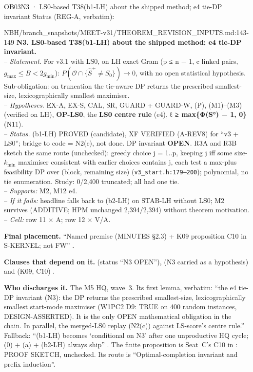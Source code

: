 \begin{card}{OB03}{N3 · LS0-based T38(b1-LH) about the shipped method; e4 tie-DP invariant}
Status (REG-A, verbatim):  
\begin{stmt}{NBH/branch_snapshots/MEET-v31/THEOREM_REVISION_INPUTS.md:143-149}
\textbf{N3. LS0-based T38(b1-LH) about the shipped method; e4 tie-DP invariant.}\\
– \emph{Statement.} For v3.1 with LS0, on LH exact Gram (p ≤ n − 1, c linked pairs, $g_{\max} ≤ B < 2g_{\min}$): $P(𝒪 ∩ \{\hat{S}^{+} ≠ S_0\}) → 0$, with no open statistical hypothesis. Sub-obligation: on truncation the tie-aware DP returns the prescribed smallest-size, lexicographically smallest maximiser.\\
– \emph{Hypotheses.} EX-A, EX-S, CAL, SR, GUARD + GUARD-W, (P), (M1)–(M3) (verified on LH), \textbf{OP-LS0}, the \textbf{LS0 centre rule} (e4), \textbf{ℓ ≥ max\{Φ(S°) − 1, 0\}} (N11).\\
– \emph{Status.} (b1-LH) PROVED (candidate), XF VERIFIED (A-REV8) for ``v3 + LS0''; bridge to code = N2(c), not done. DP invariant \textbf{OPEN}. R3A and R3B sketch the same route (unchecked): greedy choice j = 1..p, keeping j iff some size-$k_{\min}$ maximiser consistent with earlier choices contains j, each test a max-plus feasibility DP over (block, remaining size) (\texttt{v3\_start.h:179–200}); polynomial, no tie enumeration. Study: 0/2,400 truncated; all had one tie.\\
– \emph{Supports:} M2, M12 e4.\\
– \emph{If it fails:} headline falls back to (b2-LH) on STAB-LH without LS0; M2 survives (ADDITIVE; HPM unchanged 2,394/2,394) without theorem motivation.\\
– \emph{Cell:} row 11 × A; row 12 × V/A.
\end{stmt}
\textbf{Final placement.} ``Named premise (MINUTES §2.3) + K09 proposition C10 in S-KERNEL; not FW'' .

\textbf{Clauses that depend on it.}  (status ``N3 OPEN''),  (N3 carried as a hypothesis) and  (K09, C10) .

\textbf{Who discharges it.} The M5 HQ, wave~3. Its first lemma, verbatim: ``the e4 tie-DP invariant (N3): the DP returns the prescribed smallest-size, lexicographically smallest start-mode maximiser (W1PC2 D9: TRUE on 400 random instances, DESIGN-ASSERTED). It is the only OPEN mathematical obligation in the chain. In parallel, the merged-LS0 replay (N2(c)) against LS-score's centre rule.'' Fallback: ``(b1-LH) becomes `conditional on N3' after one unproductive HQ cycle; (0) + (a) + (b2-LH) always ship'' . The finite proposition is Seat~C's C10 in : PROOF SKETCH, unchecked. Its route is ``Optimal-completion invariant and prefix induction''.


\end{card}
